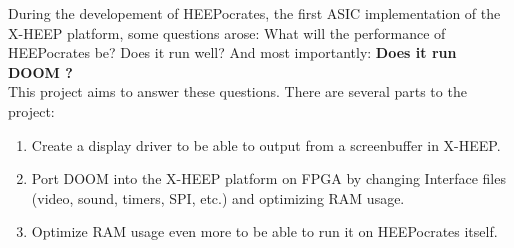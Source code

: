 During the developement of HEEPocrates, the first ASIC implementation of the X-HEEP platform, some questions arose: What will the performance of HEEPocrates be? Does it run well? And most importantly: \textbf{Does it run DOOM ?} \\
This project aims to answer these questions. There are several parts to the project: \\
\begin{enumerate}
\item Create a display driver to be able to output from a screenbuffer in X-HEEP.
\item Port DOOM into the X-HEEP platform on FPGA by changing Interface files (video, sound, timers, SPI, etc.) and optimizing RAM usage.
\item Optimize RAM usage even more to be able to run it on HEEPocrates itself.
\end{enumerate}



